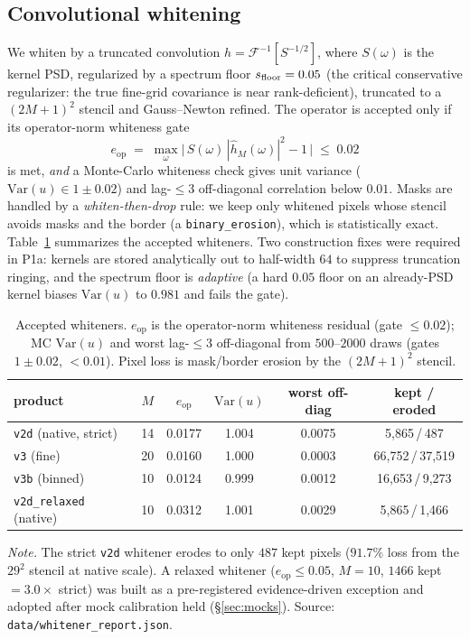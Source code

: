 \documentclass[11pt,letterpaper]{article}
\newcommand{\eop}{\ensuremath{e_{\mathrm{op}}}}
\newcommand{\dfile}[1]{\texttt{#1}}
\begin{document}
\subsection{Convolutional whitening}
\label{sec:whiten}

We whiten by a truncated convolution $h=\mathcal{F}^{-1}[S^{-1/2}]$, where
$S(\omega)$ is the kernel PSD, regularized by a spectrum floor
$s_{\rm floor}=0.05$ (the critical conservative regularizer: the true
fine-grid covariance is near rank-deficient), truncated to a $(2M+1)^2$ stencil
and Gauss--Newton refined. The operator is accepted only if its operator-norm
whiteness gate
\begin{equation}
  \eop \;=\; \max_\omega\bigl|\,S(\omega)\,|\hat h_M(\omega)|^2 - 1\,\bigr| \;\le\; 0.02
  \label{eq:eop}
\end{equation}
is met, {\it and} a Monte-Carlo whiteness check gives unit variance
($\mathrm{Var}(u)\in1\pm0.02$) and lag-$\le$3 off-diagonal correlation below
$0.01$. Masks are handled by a {\it whiten-then-drop} rule: we keep only
whitened pixels whose stencil avoids masks and the border (a
\texttt{binary\_erosion}), which is statistically exact. Table~\ref{tab:whiten}
summarizes the accepted whiteners. Two construction fixes were required in P1a:
kernels are stored analytically out to half-width $64$ to suppress truncation
ringing, and the spectrum floor is {\it adaptive} (a hard $0.05$ floor on an
already-PSD kernel biases $\mathrm{Var}(u)$ to $0.981$ and fails the gate).

\begin{table}[ht]
\centering
\caption{Accepted whiteners. $\eop$ is the operator-norm whiteness residual
(gate $\le0.02$); MC $\mathrm{Var}(u)$ and worst lag-$\le3$ off-diagonal from
$500$--$2000$ draws (gates $1\pm0.02$, $<0.01$). Pixel loss is mask/border
erosion by the $(2M{+}1)^2$ stencil.}
\label{tab:whiten}
\begin{tabular}{lccccc}
\toprule
product & $M$ & $\eop$ & $\mathrm{Var}(u)$ & worst off-diag & kept / eroded \\
\midrule
\dfile{v2d} (native, strict)   & 14 & 0.0177 & 1.004 & 0.0075 & 5{,}865\,/\,487 \\
\dfile{v3}  (fine)             & 20 & 0.0160 & 1.000 & 0.0003 & 66{,}752\,/\,37{,}519 \\
\dfile{v3b} (binned)           & 10 & 0.0124 & 0.999 & 0.0012 & 16{,}653\,/\,9{,}273 \\
\dfile{v2d\_relaxed} (native)  & 10 & 0.0312 & 1.001 & 0.0029 & 5{,}865\,/\,1{,}466 \\
\bottomrule
\end{tabular}
\par\smallskip
{\footnotesize\textit{Note.} The strict \dfile{v2d} whitener erodes to only
$487$ kept pixels ($91.7\%$ loss from the $29^2$ stencil at native scale). A
relaxed whitener ($\eop\le0.05$, $M{=}10$, $1466$ kept $=3.0\times$ strict) was
built as a pre-registered evidence-driven exception and adopted after mock
calibration held (\S\ref{sec:mocks}). Source:
\dfile{data/whitener\_report.json}.}
\end{table}
\end{document}
